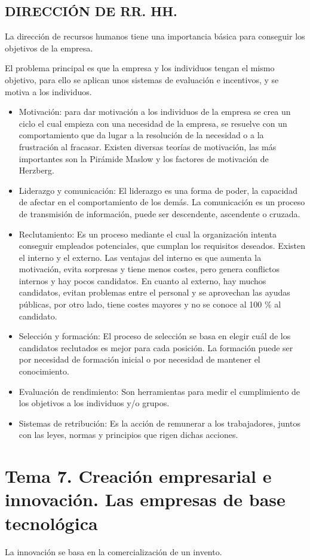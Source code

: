 \documentclass[12pt, twoside, openright]{report} %
\begin{document}
\section{DIRECCIÓN DE RR. HH.}
La dirección de recursos humanos tiene una importancia básica para conseguir los objetivos de la empresa.

El problema principal es que la empresa y los individuos tengan el mismo objetivo, para ello se aplican unos sistemas de evaluación e incentivos, y se motiva a los individuos.
\begin{itemize}
	\item Motivación: para dar motivación a los individuos de la empresa se crea un ciclo el cual empieza con una necesidad de la empresa, se resuelve con un comportamiento que da lugar a la resolución de la necesidad o a la frustración al fracasar. Existen diversas teorías de motivación, las más importantes son la Pirámide Maslow y los factores de motivación de Herzberg.
	\item Liderazgo y comunicación: El liderazgo es una forma de poder, la capacidad de afectar en el comportamiento de los demás. La comunicación es un proceso de transmisión de información, puede ser descendente, ascendente o cruzada.
	\item Reclutamiento: Es un proceso mediante el cual la organización intenta conseguir empleados potenciales, que cumplan los requisitos deseados. Existen el interno y el externo. Las ventajas del interno es que aumenta la motivación, evita sorpresas y tiene menos costes, pero genera conflictos internos y hay pocos candidatos. En cuanto al externo, hay muchos candidatos, evitan problemas entre el personal y se aprovechan las ayudas públicas, por otro lado, tiene costes mayores y no se conoce al 100 \% al candidato.
	\item Selección y formación: El proceso de selección se basa en elegir cuál de los candidatos reclutados es mejor para cada posición. La formación puede ser por necesidad de formación inicial o por necesidad de mantener el conocimiento.
	\item Evaluación de rendimiento: Son herramientas para medir el cumplimiento de los objetivos a los individuos y/o grupos.
	\item Sistemas de retribución: Es la acción de remunerar a los trabajadores, juntos con las leyes, normas y principios que rigen dichas acciones.
\end{itemize}



\chapter{Tema 7. Creación empresarial e innovación. Las empresas de base tecnológica}
La innovación se basa en la comercialización de un invento.
\end{document}
